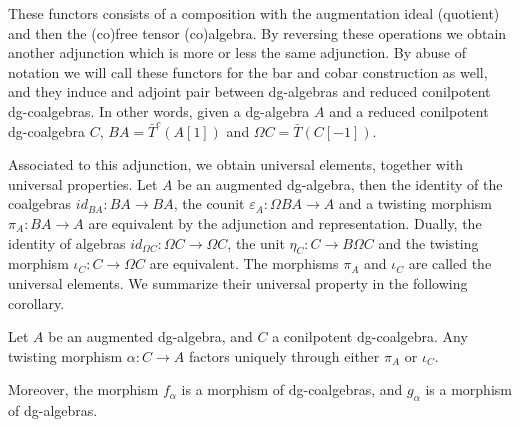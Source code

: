 \documentclass[../thesis.tex]{subfiles}
\begin{document}
            \begin{remark}
                These functors consists of a composition with the augmentation ideal (quotient) and then the (co)free tensor (co)algebra. By reversing these operations we obtain another adjunction which is more or less the same adjunction. By abuse of notation we will call these functors for the bar and cobar construction as well, and they induce and adjoint pair between dg-algebras and reduced conilpotent dg-coalgebras. In other words, given a dg-algebra $A$ and a reduced conilpotent dg-coalgebra $C$, $BA = \bar{T}^c(A[1])$ and $\Omega C = \bar{T}(C[-1])$.
                \begin{center}
                \end{center}
            \end{remark}

            Associated to this adjunction, we obtain universal elements, together with universal properties. Let $A$ be an augmented dg-algebra, then the identity of the coalgebras $id_{BA} : BA \rightarrow BA$, the counit $\varepsilon_A : \Omega BA \rightarrow A$ and a twisting morphism $\pi_A : BA \rightarrow A$ are equivalent by the adjunction and representation. Dually, the identity of algebras $id_{\Omega C} : \Omega C\rightarrow\Omega C$, the unit $\eta_C : C \rightarrow B\Omega C$ and the twisting morphism $\iota_C : C\rightarrow \Omega C$ are equivalent. The morphisms $\pi_A$ and $\iota_C$ are called the universal elements. We summarize their universal property in the following corollary.

            \begin{corollary}\label{cor: universal-twisting}
                Let $A$ be an augmented dg-algebra, and $C$ a conilpotent dg-coalgebra. Any twisting morphism $\alpha : C \rightarrow A$ factors uniquely through either $\pi_A$ or $\iota_C$.
                
                \begin{center}
                \end{center}
                Moreover, the morphism $f_\alpha$ is a morphism of dg-coalgebras, and $g_\alpha$ is a morphism of dg-algebras.
            \end{corollary}
\end{document}
